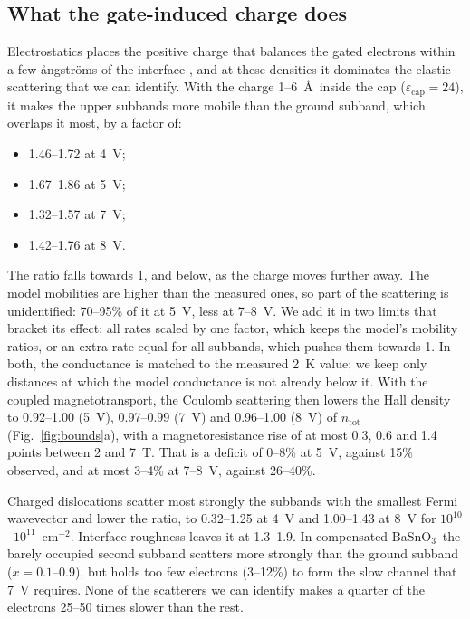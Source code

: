 \documentclass[11pt]{article}
\newcommand{\BSO}{\texorpdfstring{BaSnO$_3$}{BaSnO3}}
\newcommand{\ntot}{n_\mathrm{tot}}
\begin{document}
\subsection{What the gate-induced charge does}\label{sec:coulomb}
Electrostatics places the positive charge that balances the gated electrons within a few \aa ngstr\"oms of the interface \cite{OwnbyMAT02}, and at these densities it dominates the elastic scattering that we can identify. With the charge 1--6~\AA\ inside the cap ($\varepsilon_\mathrm{cap}=24$), it makes the upper subbands more mobile than the ground subband, which overlaps it most, by a factor of:
\begin{itemize}
\item 1.46--1.72 at 4~V;
\item 1.67--1.86 at 5~V;
\item 1.32--1.57 at 7~V;
\item 1.42--1.76 at 8~V.
\end{itemize}
The ratio falls towards 1, and below, as the charge moves further away. The model mobilities are higher than the measured ones, so part of the scattering is unidentified: 70--95\% of it at 5~V, less at 7--8~V. We add it in two limits that bracket its effect: all rates scaled by one factor, which keeps the model's mobility ratios, or an extra rate equal for all subbands, which pushes them towards 1. In both, the conductance is matched to the measured 2~K value; we keep only distances at which the model conductance is not already below it. With the coupled magnetotransport, the Coulomb scattering then lowers the Hall density to 0.92--1.00 (5~V), 0.97--0.99 (7~V) and 0.96--1.00 (8~V) of $\ntot$ (Fig.~\ref{fig:bounds}a), with a magnetoresistance rise of at most 0.3, 0.6 and 1.4 points between 2 and 7~T. That is a deficit of 0--8\% at 5~V, against 15\% observed, and at most 3--4\% at 7--8~V, against 26--40\%.

Charged dislocations scatter most strongly the subbands with the smallest Fermi wavevector and lower the ratio, to 0.32--1.25 at 4~V and 1.00--1.43 at 8~V for $10^{10}$--$10^{11}$~cm$^{-2}$. Interface roughness leaves it at 1.3--1.9. In compensated \BSO\ the barely occupied second subband scatters more strongly than the ground subband ($x=0.1$--0.9), but holds too few electrons (3--12\%) to form the slow channel that 7~V requires. None of the scatterers we can identify makes a quarter of the electrons 25--50 times slower than the rest.
\end{document}
